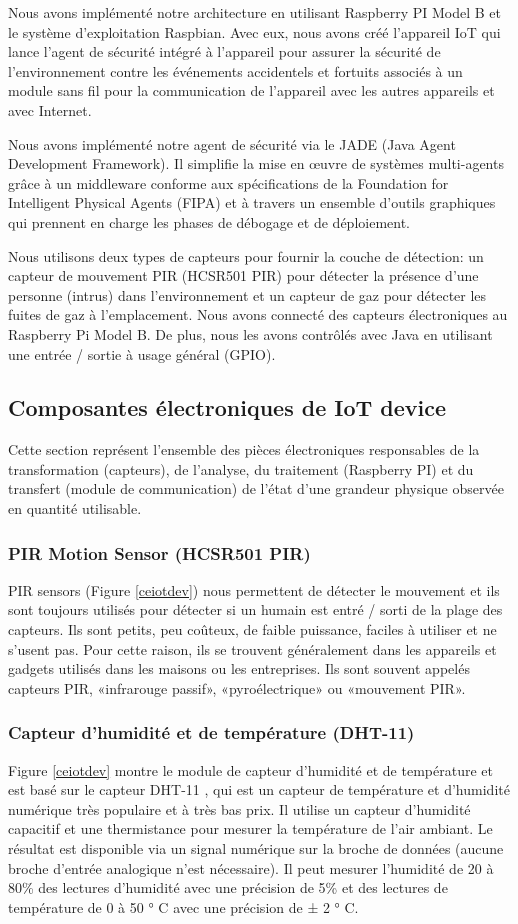 Nous avons implémenté notre architecture en utilisant Raspberry PI Model B et le système d'exploitation Raspbian. Avec eux, nous avons créé l'appareil IoT qui lance l'agent de sécurité intégré à l'appareil pour assurer la sécurité de l'environnement contre les événements accidentels et fortuits associés à un module sans fil pour la communication de l'appareil avec les autres appareils et avec Internet.


Nous avons implémenté notre agent de sécurité via le JADE (Java Agent Development Framework). Il simplifie la mise en œuvre de systèmes multi-agents grâce à un middleware conforme aux spécifications de la Foundation for Intelligent Physical Agents (FIPA)  et à travers un ensemble d'outils graphiques qui prennent en charge les phases de débogage et de déploiement.


Nous utilisons deux types de capteurs pour fournir la couche de détection: un capteur de mouvement PIR (HCSR501 PIR) pour détecter la présence d'une personne (intrus) dans l'environnement et un capteur de gaz pour détecter les fuites de gaz à l'emplacement. Nous avons connecté des capteurs électroniques au Raspberry Pi Model B. De plus, nous les avons contrôlés avec Java en utilisant une entrée / sortie à usage général (GPIO).

\subsection{Composantes électroniques de IoT device}
Cette section représent l'ensemble des pièces électroniques  responsables de la transformation (capteurs), de l'analyse, du traitement (Raspberry PI) et du transfert (module de communication) de l'état d'une grandeur physique observée en quantité utilisable.
\subsubsection{PIR Motion Sensor (HCSR501 PIR)}
PIR sensors (Figure \ref{ceiotdev}) nous permettent de détecter le mouvement  et ils sont toujours utilisés pour détecter si un humain est entré / sorti de la plage des capteurs. Ils sont petits, peu coûteux, de faible puissance, faciles à utiliser et ne s'usent pas. Pour cette raison, ils se trouvent généralement dans les appareils et gadgets utilisés dans les maisons ou les entreprises. Ils sont souvent appelés capteurs PIR, «infrarouge passif», «pyroélectrique» ou «mouvement PIR».
\subsubsection{Capteur d'humidité et de température (DHT-11)}
Figure \ref{ceiotdev} montre le module de capteur d'humidité et de température et est basé sur le capteur DHT-11 , qui est un capteur de température et d'humidité numérique très populaire et à très bas prix. Il utilise un capteur d'humidité capacitif et une thermistance pour mesurer la température de l'air ambiant. Le résultat est disponible via un signal numérique sur la broche de données (aucune broche d'entrée analogique n'est nécessaire). Il peut mesurer l'humidité de 20 à 80\% des lectures d'humidité avec une précision de 5\% et des lectures de température de 0 à 50 ° C avec une précision de ± 2 ° C.


